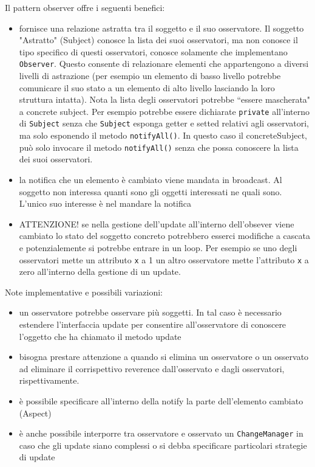\documentclass{article}
\begin{document}
Il pattern observer offre i seguenti benefici:
\begin{itemize}
\item fornisce una relazione astratta tra il soggetto e il suo osservatore. Il soggetto "Astratto" (Subject) conosce la lista dei suoi osservatori, ma non conosce il tipo specifico di questi osservatori, conosce solamente che implementano \texttt{Observer}. Questo consente di relazionare elementi che appartengono a diversi livelli di astrazione (per esempio un elemento di basso livello potrebbe comunicare il suo stato a un elemento di alto livello lasciando la loro struttura intatta). Nota la lista degli osservatori potrebbe ``essere mascherata" a concrete subject. Per esempio potrebbe essere dichiarate \texttt{private} all'interno di \texttt{Subject} senza che \texttt{Subject} esponga getter e setted relativi agli osservatori, ma solo esponendo il metodo \texttt{notifyAll()}. In questo caso il concreteSubject, pu\`o solo invocare il metodo \texttt{notifyAll()} senza che possa conoscere la lista dei suoi osservatori.
\item la notifica che un elemento \`e cambiato viene mandata in broadcast. Al soggetto non interessa quanti sono gli oggetti interessati ne quali sono. L'unico suo interesse \`e nel mandare la notifica
\item ATTENZIONE! se nella gestione dell'update all'interno dell'obsever viene cambiato lo stato del soggetto concreto potrebbero esserci modifiche a cascata e potenzialemente si potrebbe entrare in un loop. Per esempio se uno degli osservatori mette un attributo \texttt{x} a 1 un altro osservatore mette l'attributo \texttt{x} a zero all'interno della gestione di un update. 
\end{itemize}

Note implementative e possibili variazioni:
\begin{itemize}
\item un osservatore potrebbe osservare pi\`u soggetti. In tal caso \`e necessario estendere l'interfaccia update per consentire all'osservatore di conoscere l'oggetto che ha chiamato il metodo update
\item bisogna prestare attenzione a quando si elimina un osservatore o un osservato ad eliminare il corrispettivo reverence dall'osservato e dagli osservatori, rispettivamente.
\item \`e possibile specificare all'interno della notify la parte dell'elemento cambiato (Aspect)
\item \`e anche possibile interporre tra osservatore e osservato un \texttt{ChangeManager} in caso che gli update siano complessi o si debba specificare particolari strategie di update
\end{itemize}
\end{document}
